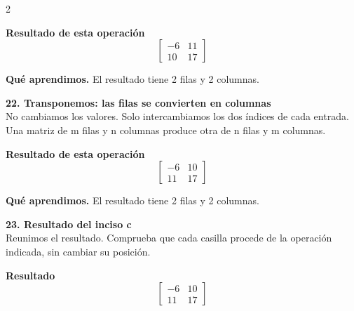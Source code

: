 \documentclass[11pt,a4paper,landscape]{article}
\begin{document}
\begin{multicols*}{2}
\begin{minipage}{\linewidth}
\par\smallskip \textbf{Resultado de esta operación}\[\begin{bmatrix}-6 & 11\\10 & 17\end{bmatrix}\]
\par\smallskip\textbf{Qué aprendimos.} El resultado tiene 2 filas y 2 columnas.
\end{minipage}\par\medskip
\noindent\begin{minipage}{\linewidth}\textbf{22. Transponemos: las filas se convierten en columnas}\\[2pt]No cambiamos los valores. Solo intercambiamos los dos índices de cada entrada. Una matriz de m filas y n columnas produce otra de n filas y m columnas.
\par{}\par\smallskip
\par\smallskip \textbf{Resultado de esta operación}\[\begin{bmatrix}-6 & 10\\11 & 17\end{bmatrix}\]
\par\smallskip\textbf{Qué aprendimos.} El resultado tiene 2 filas y 2 columnas.
\end{minipage}\par\medskip
\noindent\begin{minipage}{\linewidth}\textbf{23. Resultado del inciso c}\\[2pt]Reunimos el resultado. Comprueba que cada casilla procede de la operación indicada, sin cambiar su posición.
\par\smallskip \textbf{Resultado}\[\begin{bmatrix}-6 & 10\\11 & 17\end{bmatrix}\]

\end{minipage}
\end{multicols*}
\end{document}
